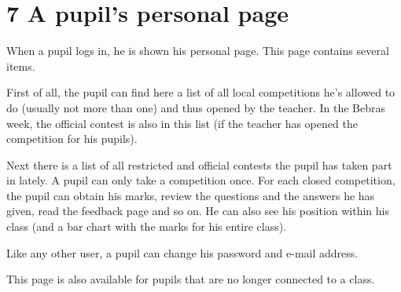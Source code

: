 \section*{7 A pupil's personal page}

When a pupil logs in, he is shown his personal page. This page contains several
items.
  
First of all, the pupil can find here a list of all local competitions he's
allowed to do (usually not more than one) and thus opened by the teacher. In
the Bebras week, the official contest is also in this list (if the teacher
has opened the competition for his pupils).

Next there is a list of all restricted and official contests the pupil has
taken part in lately. A pupil can only take a competition once. For each
closed competition, the pupil can obtain his marks, review the questions and
the answers he has given, read the feedback page and so on. He can also see
his position within his class (and a bar chart with the marks for his entire
class).

Like any other user, a pupil can change his password and e-mail address.  

This page is also available for pupils that are no longer connected to a
class.
